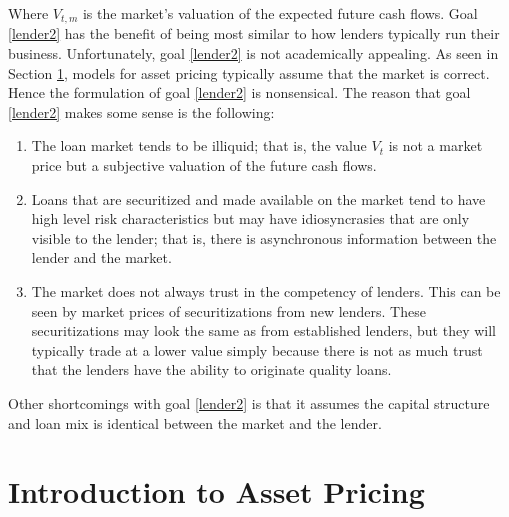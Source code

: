 \documentclass{article}
\theoremstyle{definition}
\begin{document}
Where \(V_{t, m}\) is the market's valuation of the expected future cash flows.  Goal \ref{lender2} has the benefit of being most similar to how lenders typically run their business.  Unfortunately, goal \ref{lender2} is not academically appealing.  As seen in Section \ref{assetPricing}, models for asset pricing typically assume that the market is correct.  Hence the formulation of goal \ref{lender2} is nonsensical.  The reason that goal \ref{lender2} makes some sense is the following:


\begin{enumerate}
	\item The loan market tends to be illiquid; that is, the value \(V_t\) is not a market price but a subjective valuation of the future cash flows.
	\item Loans that are securitized and made available on the market tend to have high level risk characteristics but may have idiosyncrasies that are only visible to the lender; that is, there is asynchronous information between the lender and the market.  
	\item The market does not always trust in the competency of lenders.  This can be seen by market prices of securitizations from new lenders.  These securitizations may look the same as from established lenders, but they will typically trade at a lower value simply because there is not as much trust that the lenders have the ability to originate quality loans.  
	
\end{enumerate}

Other shortcomings with goal \ref{lender2} is that it assumes the capital structure and loan mix is identical between the market and the lender.  

\section{Introduction to Asset Pricing} \label{assetPricing}
\end{document}
